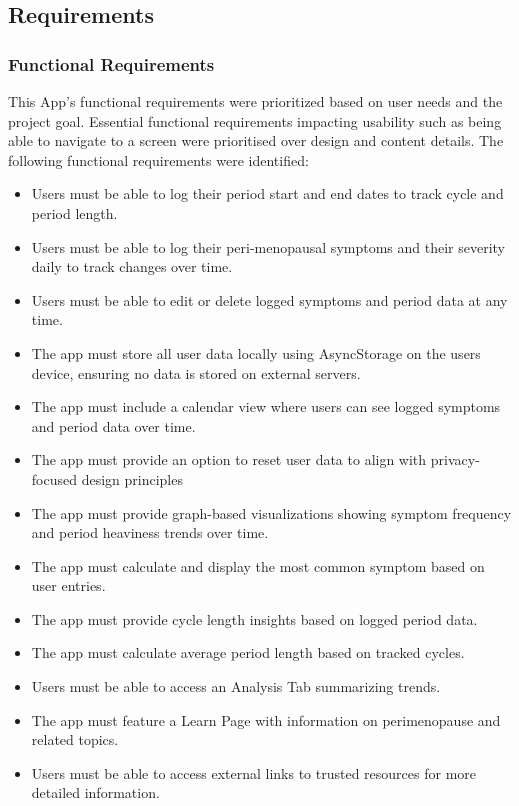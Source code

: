 \subsection{Requirements}

\subsubsection{Functional Requirements}
This App's functional requirements were prioritized based on user needs and the project goal. Essential functional requirements impacting usability such as being able to navigate to a screen were prioritised over design and content details. The following functional requirements were identified:

\begin{itemize}
      \item Users must be able to log their period start and end dates to track cycle and period length.
      \item Users must be able to log their peri-menopausal symptoms and their severity daily to track changes over time.
      \item Users must be able to edit or delete logged symptoms and period data at any time.
      \item The app must store all user data locally using AsyncStorage on the users device, ensuring no data is stored on external servers.
      \item The app must include a calendar view where users can see logged symptoms and period data over time.
      \item The app must provide an option to reset user data to align with privacy-focused design principles
      \item The app must provide graph-based visualizations showing symptom frequency and period heaviness trends over time.
      \item The app must calculate and display the most common symptom based on user entries.
      \item The app must provide cycle length insights based on logged period data.
      \item The app must calculate average period length based on tracked cycles.
      \item Users must be able to access an Analysis Tab summarizing trends.
      \item The app must feature a Learn Page with information on perimenopause and related topics.
      \item Users must be able to access external links to trusted resources for more detailed information.

\end{itemize}
